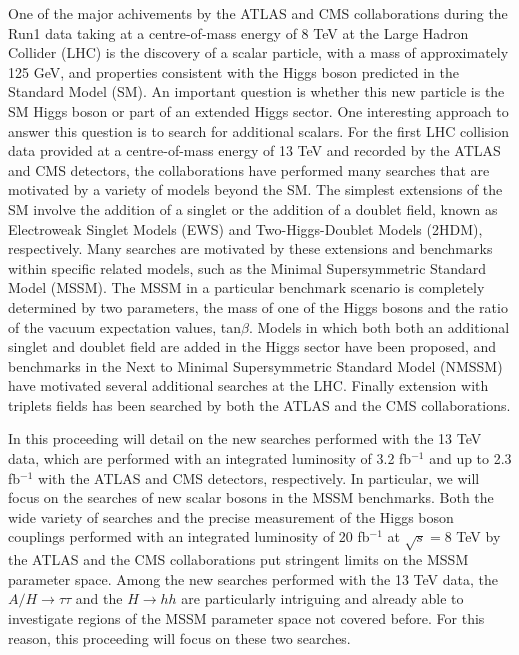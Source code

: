 One of the major achivements by the ATLAS and CMS collaborations during the Run1 data taking at a centre-of-mass energy of 8 TeV  at the Large Hadron Collider (LHC) is the discovery of a scalar particle, with a mass of approximately 125 GeV, and properties  consistent with the Higgs boson predicted in the Standard Model (SM). 
 An important question is whether this new particle is the SM Higgs boson or part of an extended Higgs sector. One interesting approach to answer this question is to search for additional scalars.
For the first LHC collision data provided at a centre-of-mass energy of 13 TeV and recorded
by the ATLAS and CMS detectors, the collaborations have performed many searches that are
motivated by a variety of models beyond the SM. The simplest extensions of the SM involve the
addition of a singlet or  the addition of a doublet field, known as Electroweak Singlet Models (EWS)
and Two-Higgs-Doublet Models (2HDM), respectively. Many searches are motivated by these
extensions and benchmarks within specific related models, such as the Minimal Supersymmetric
Standard Model (MSSM). The MSSM in a particular benchmark scenario is completely
determined by two parameters, the mass of one of the Higgs bosons and the ratio of the vacuum
expectation values, tan$\beta$. Models in which both both an additional singlet and doublet field are added in the Higgs sector have been proposed, and benchmarks in the Next to Minimal Supersymmetric
Standard Model (NMSSM) have motivated several additional searches at the LHC. Finally extension with triplets fields has been searched by both the ATLAS and the CMS collaborations.

In this proceeding will detail  on the new searches performed with the 13 TeV
data, which are performed with an integrated luminosity of 3.2 fb$^{−1}$ and up to 2.3 fb$^{−1}$ with the
ATLAS and CMS detectors, respectively. In particular, we will focus on the searches of new scalar bosons in the MSSM benchmarks. Both the wide variety of searches and the precise measurement of the Higgs boson couplings  performed with an integrated luminosity of  20 fb$^{−1}$ at $\sqrt{s}=$8 TeV by the ATLAS and the CMS collaborations put stringent limits on the MSSM parameter space. Among the new searches performed with the 13 TeV data, the $A/H\rightarrow\tau\tau$ and the $H\rightarrow hh$ are particularly intriguing and already able to investigate regions of the MSSM parameter space not covered before. 
For this reason, this proceeding will focus on these two searches.

